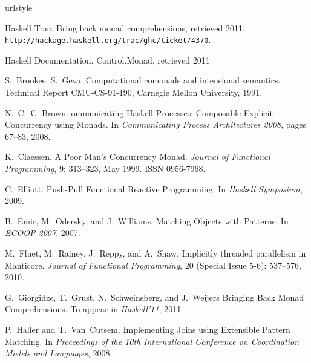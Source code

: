 \documentclass{sigplanconf}
\begin{document}
\begin{thebibliography}{37}
\raggedright
\providecommand{\natexlab}[1]{#1}
\providecommand{\url}[1]{\texttt{#1}}
\expandafter\ifx\csname urlstyle\endcsname\relax
  \providecommand{\doi}[1]{doi: #1}\else
  \providecommand{\doi}{doi: \begingroup \urlstyle{rm}\Url}\fi

Haskell Trac.
\newblock Bring back monad comprehensions, retrieved 2011.
\url{http://hackage.haskell.org/trac/ghc/ticket/4370}.

Haskell Documentation.
\newblock Control.Monad, retrieved 2011

S.~Brookes, S.~Geva.
\newblock Computational comonads and intensional semantics.
\newblock Technical Report CMU-CS-91-190, Carnegie Mellon University, 1991.

N.~C.~C. Brown.
ommunicating {H}askell {P}rocesses: {C}omposable {E}xplicit
  {C}oncurrency using {M}onads.
\newblock In \emph{{C}ommunicating {P}rocess {A}rchitectures 2008}, pages
  67--83, 2008.

K.~Claessen.
\newblock A Poor Man's Concurrency Monad.
\newblock \emph{Journal of Functional Programming}, 9: 313--323, May
  1999.
\newblock ISSN 0956-7968.

C.~Elliott.
\newblock Push-Pull Functional Reactive Programming.
\newblock In \emph{Haskell Symposium}, 2009.

B.~Emir, M.~Odersky, and J.~Williams.
\newblock Matching Objects with Patterns.
\newblock In \emph{ECOOP 2007}, 2007.

M.~Fluet, M.~Rainey, J.~Reppy, and A.~Shaw.
\newblock Implicitly threaded parallelism in {M}anticore.
\newblock \emph{Journal of Functional Programming}, 20 (Special Issue
  5-6): 537--576, 2010.

G.~Giorgidze, T.~Grust, N.~Schweinsberg, and J.~Weijers
\newblock Bringing Back Monad Comprehensions.
\newblock To appear in \emph{Haskell'11}, 2011

P.~Haller and T.~Van~Cutsem.
\newblock Implementing {J}oins using {E}xtensible {P}attern {M}atching.
\newblock In \emph{Proceedings of the 10th {I}nternational {C}onference on
  {C}oordination {M}odels and {L}anguages}, 2008.


\end{thebibliography}
\end{document}
